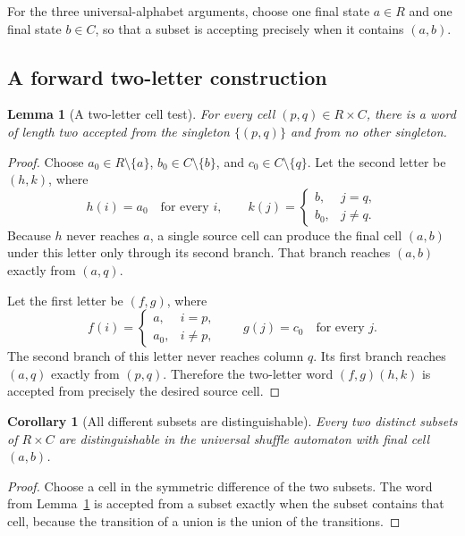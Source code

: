 \documentclass[11pt,letterpaper]{article}
\numberwithin{equation}{section}
\newtheorem{lemma}[theorem]{Lemma}
\newtheorem{corollary}[theorem]{Corollary}
\theoremstyle{definition}
\theoremstyle{remark}
\begin{document}
For the three universal-alphabet arguments, choose one final state $a\in R$
and one final state $b\in C$, so that a subset is accepting precisely when it
contains $(a,b)$.

\subsection{A forward two-letter construction}
\begin{lemma}[A two-letter cell test]\label{lem:celltest}
For every cell $(p,q)\in R\times C$, there is a word of length two accepted
from the singleton $\{(p,q)\}$ and from no other singleton.
\end{lemma}
\begin{proof}
Choose $a_0\in R\setminus\{a\}$, $b_0\in C\setminus\{b\}$, and
$c_0\in C\setminus\{q\}$. Let the second letter be $(h,k)$, where
\[
 h(i)=a_0\quad\text{for every }i,\qquad
 k(j)=\begin{cases}b,&j=q,\\ b_0,&j\ne q.\end{cases}
\]
Because $h$ never reaches $a$, a single source cell can produce the final
cell $(a,b)$ under this letter only through its second branch. That branch
reaches $(a,b)$ exactly from $(a,q)$.

Let the first letter be $(f,g)$, where
\[
 f(i)=\begin{cases}a,&i=p,\\ a_0,&i\ne p,\end{cases}
 \qquad g(j)=c_0\quad\text{for every }j.
\]
The second branch of this letter never reaches column $q$. Its first
branch reaches $(a,q)$ exactly from $(p,q)$. Therefore the two-letter word
$(f,g)(h,k)$ is accepted from precisely the desired source cell.
\end{proof}

\begin{corollary}[All different subsets are distinguishable]\label{cor:distinct}
Every two distinct subsets of $R\times C$ are distinguishable in the
universal shuffle automaton with final cell $(a,b)$.
\end{corollary}
\begin{proof}
Choose a cell in the symmetric difference of the two subsets. The word
from Lemma~\ref{lem:celltest} is accepted from a subset exactly when the
subset contains that cell, because the transition of a union is the union
of the transitions.
\end{proof}
\end{document}
